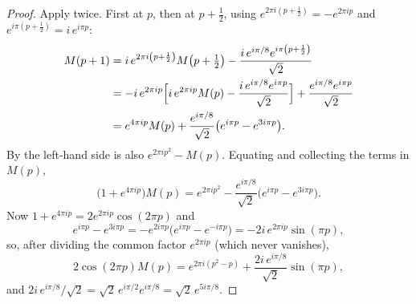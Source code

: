 \begin{proof}
\leanok
{}
Apply  twice.  First at $p$, then at $p+\tfrac12$, using
$e^{2\pi i\left(p+\frac12\right)}=-e^{2\pi ip}$ and $e^{i\pi\left(p+\frac12\right)}=i\,e^{i\pi p}$:
\begin{align*}
  M(p+1)&=i\,e^{2\pi i\left(p+\frac12\right)}M\bigl(p+\tfrac12\bigr)
          -\frac{i\,e^{i\pi/8}e^{i\pi\left(p+\frac12\right)}}{\sqrt2}\\
        &=-i\,e^{2\pi ip}\Bigl[i\,e^{2\pi ip}M(p)-\frac{i\,e^{i\pi/8}e^{i\pi p}}{\sqrt2}\Bigr]
          +\frac{e^{i\pi/8}e^{i\pi p}}{\sqrt2}\\
        &=e^{4\pi ip}M(p)+\frac{e^{i\pi/8}}{\sqrt2}\bigl(e^{i\pi p}-e^{3i\pi p}\bigr).
\end{align*}
By  the left-hand side is also $e^{2\pi ip^{2}}-M(p)$.  Equating and
collecting the terms in $M(p)$,
\[
  \bigl(1+e^{4\pi ip}\bigr)M(p)
   =e^{2\pi ip^{2}}-\frac{e^{i\pi/8}}{\sqrt2}\bigl(e^{i\pi p}-e^{3i\pi p}\bigr).
\]
Now $1+e^{4\pi ip}=2e^{2\pi ip}\cos(2\pi p)$ and
\[
  e^{i\pi p}-e^{3i\pi p}=-e^{2i\pi p}\bigl(e^{i\pi p}-e^{-i\pi p}\bigr)=-2i\,e^{2\pi ip}\sin(\pi p),
\]
so, after dividing the common factor $e^{2\pi ip}$ (which never vanishes),
\[
  2\cos(2\pi p)M(p)=e^{2\pi i\left(p^{2}-p\right)}+\frac{2i\,e^{i\pi/8}}{\sqrt2}\sin(\pi p),
\]
and $2i\,e^{i\pi/8}/\sqrt2=\sqrt2\,e^{i\pi/2}e^{i\pi/8}=\sqrt2\,e^{5i\pi/8}$.
\end{proof}


